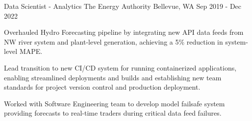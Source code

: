 \begin{cventries}
    \cventry
    {Data Scientist - Analytics} %
    {The Energy Authority} %
    {Bellevue, WA} %
    {Sep 2019 - Dec 2022} %
    {
      \begin{cvitems} %
        \item {Overhauled Hydro Forecasting pipeline by integrating new API data feeds from NW river system and plant-level generation, achieving a 5\% reduction in system-level MAPE.}
        \item {Lead transition to new CI/CD system for running containerized applications, enabling streamlined deployments and builds and establishing new team standards for project version control and production deployment.}
        \item {Worked with Software Engineering team to develop model failsafe system providing forecasts to real-time traders during critical data feed failures.}
      \end{cvitems}
    }


\end{cventries}
